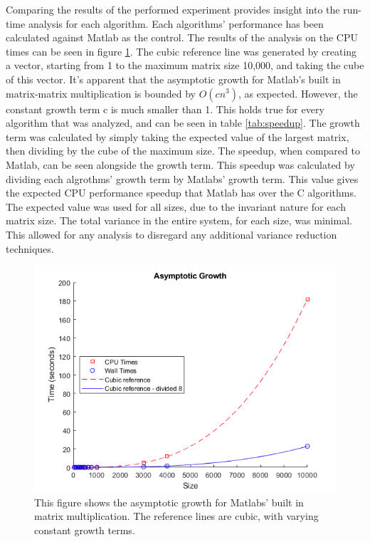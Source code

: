 \documentclass[sigconf]{acmart}
\begin{document}
Comparing the results of the performed experiment provides insight into the run-time analysis for each algorithm. Each algorithms' performance has been calculated against Matlab as the control. The results of the analysis on the CPU times can be seen in figure \ref{matlab}. The cubic reference line was generated by creating a vector, starting from 1 to the maximum matrix size 10,000, and taking the cube of this vector. It's apparent that the asymptotic growth for Matlab's built in matrix-matrix multiplication is bounded by $O(cn^{3})$, as expected. However, the constant growth term c is much smaller than 1. This holds true for every algorithm that was analyzed, and can be seen in table \ref{tab:speedup}. The growth term was calculated by simply taking the expected value of the largest matrix, then dividing by the cube of the maximum size. The speedup, when compared to Matlab, can be seen alongside the growth term. This speedup was calculated by dividing each algrothms' growth term by Matlabs' growth term. This value gives the expected CPU performance speedup that Matlab has over the C algorithms. The expected value was used for all sizes, due to the invariant nature for each matrix size. The total variance in the entire system, for each size, was minimal. This allowed for any analysis to disregard any additional variance reduction techniques.

\begin{figure}[h]
  \centering
  \includegraphics[width=\linewidth]{graphs/matlab.png}
  \caption{This figure shows the asymptotic growth for Matlabs' built in matrix multiplication. The reference lines are cubic, with varying constant growth terms.}
  \Description{}
  \label{matlab}
\end{figure}
\end{document}
